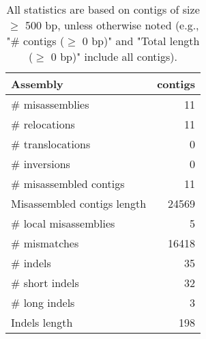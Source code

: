 \documentclass[12pt,a4paper]{article}
\begin{document}
\begin{table}[ht]
\begin{center}
\caption{All statistics are based on contigs of size $\geq$ 500 bp, unless otherwise noted (e.g., "\# contigs ($\geq$ 0 bp)" and "Total length ($\geq$ 0 bp)" include all contigs).}
\begin{tabular}{|l*{1}{|r}|}
\hline
Assembly & contigs \\ \hline
\# misassemblies & 11 \\ \hline
\hspace{5mm}\# relocations & 11 \\ \hline
\hspace{5mm}\# translocations & 0 \\ \hline
\hspace{5mm}\# inversions & 0 \\ \hline
\# misassembled contigs & 11 \\ \hline
Misassembled contigs length & 24569 \\ \hline
\# local misassemblies & 5 \\ \hline
\# mismatches & 16418 \\ \hline
\# indels & 35 \\ \hline
\hspace{5mm}\# short indels & 32 \\ \hline
\hspace{5mm}\# long indels & 3 \\ \hline
Indels length & 198 \\ \hline
\end{tabular}
\end{center}
\end{table}
\end{document}
